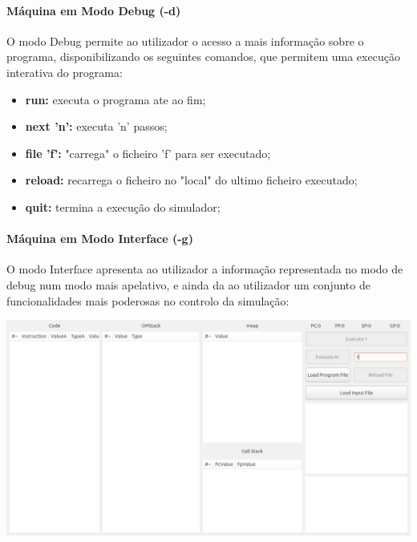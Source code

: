 \documentclass{report}
\begin{document}
\paragraph{\quad Máquina em Modo Debug (-d)}
	O modo Debug permite ao utilizador o acesso a mais informação sobre o programa, disponibilizando
  os seguintes comandos, que permitem uma execução interativa do programa:
\begin{itemize}
	\item \textbf{run:} executa o programa ate ao fim;
	\item \textbf{next 'n':} executa 'n' passos;
	\item \textbf{file 'f':} "carrega" o ficheiro 'f' para ser executado;
	\item \textbf{reload:} recarrega o ficheiro no "local" do ultimo ficheiro executado;
	\item \textbf{quit:} termina a execução do simulador;
\end{itemize}
\paragraph{\quad Máquina em Modo Interface (-g)}
  O modo Interface apresenta ao utilizador a informação representada no modo de debug num modo mais apelativo,
	e ainda da ao utilizador um conjunto de funcionalidades mais poderosas no controlo da simulação:

	\begin{center}
	\includegraphics[width=15cm]{gtk2.png}
	\end{center}
\end{document}
